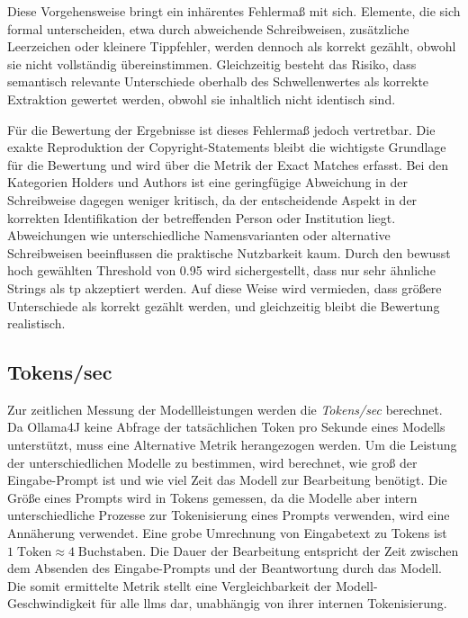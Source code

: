 Diese Vorgehensweise bringt ein inhärentes Fehlermaß mit sich.
Elemente, die sich formal unterscheiden, etwa durch abweichende Schreibweisen, zusätzliche Leerzeichen oder kleinere Tippfehler, werden dennoch als korrekt gezählt, obwohl sie nicht vollständig übereinstimmen.
Gleichzeitig besteht das Risiko, dass semantisch relevante Unterschiede oberhalb des Schwellenwertes als korrekte Extraktion gewertet werden, obwohl sie inhaltlich nicht identisch sind.

Für die Bewertung der Ergebnisse ist dieses Fehlermaß jedoch vertretbar.
Die exakte Reproduktion der Copyright-Statements bleibt die wichtigste Grundlage für die Bewertung und wird über die Metrik der Exact Matches erfasst.
Bei den Kategorien Holders und Authors ist eine geringfügige Abweichung in der Schreibweise dagegen weniger kritisch, da der entscheidende Aspekt in der korrekten Identifikation der betreffenden Person oder Institution liegt.
Abweichungen wie unterschiedliche Namensvarianten oder alternative Schreibweisen beeinflussen die praktische Nutzbarkeit kaum.
Durch den bewusst hoch gewählten Threshold von \num{0,95} wird sichergestellt, dass nur sehr ähnliche Strings als \gls{tp} akzeptiert werden.
Auf diese Weise wird vermieden, dass größere Unterschiede als korrekt gezählt werden, und gleichzeitig bleibt die Bewertung realistisch.


\subsection{Tokens/sec}
Zur zeitlichen Messung der Modellleistungen werden die \textit{Tokens/sec} berechnet.
Da Ollama4J keine Abfrage der tatsächlichen Token pro Sekunde eines Modells unterstützt, muss eine Alternative Metrik herangezogen werden.
Um die Leistung der unterschiedlichen Modelle zu bestimmen, wird berechnet, wie groß der Eingabe-Prompt ist und wie viel Zeit das Modell zur Bearbeitung benötigt.
Die Größe eines Prompts wird in Tokens gemessen, da die Modelle aber intern unterschiedliche Prozesse zur Tokenisierung eines Prompts verwenden, wird eine Annäherung verwendet.
Eine grobe Umrechnung von Eingabetext zu Tokens ist $1\;\text{Token}\approx 4\;\text{Buchstaben}$\autocite{noauthor_what_nodate}.
Die Dauer der Bearbeitung entspricht der Zeit zwischen dem Absenden des Eingabe-Prompts und der Beantwortung durch das Modell.
Die somit ermittelte Metrik stellt eine Vergleichbarkeit der Modell-Geschwindigkeit für alle \glspl{llm} dar, unabhängig von ihrer internen Tokenisierung.


